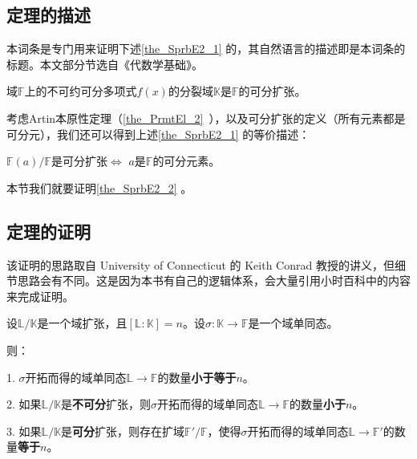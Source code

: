 

\subsection{定理的描述}

本词条是专门用来证明下述\autoref{the_SprbE2_1} 的，其自然语言的描述即是本词条的标题。本文部分节选自《代数学基础》。

\begin{theorem}{}\label{the_SprbE2_1}
域$\mathbb{F}$上的不可约可分多项式$f(x)$的分裂域$\mathbb{K}$是$\mathbb{F}$的可分扩张。
\end{theorem}

考虑Artin本原性定理（\autoref{the_PrmtEl_2}~），以及可分扩张的定义（所有元素都是可分元），我们还可以得到上述\autoref{the_SprbE2_1} 的等价描述：

\begin{theorem}{}\label{the_SprbE2_2}
$\mathbb{F}(a)/\mathbb{F}$是可分扩张$\iff$ $a$是$\mathbb{F}$的可分元素。
\end{theorem}

本节我们就要证明\autoref{the_SprbE2_2} 。



\subsection{定理的证明}
该证明的思路取自 University of Connecticut 的 Keith Conrad 教授的讲义，但细节思路会有不同。这是因为本书有自己的逻辑体系，会大量引用小时百科中的内容来完成证明。

\begin{lemma}{}\label{lem_SprbE2_1}
设$\mathbb{L}/\mathbb{K}$是一个域扩张，且$[\mathbb{L}:\mathbb{K}]=n$。设$\sigma:\mathbb{K}\to\mathbb{F}$是一个域单同态。

则：

1. $\sigma$开拓而得的域单同态$\mathbb{L}\to\mathbb{F}$的数量\textbf{小于等于}$n$。

2. 如果$\mathbb{L}/\mathbb{K}$是\textbf{不可分}扩张，则$\sigma$开拓而得的域单同态$\mathbb{L}\to\mathbb{F}$的数量\textbf{小于}$n$。

3. 如果$\mathbb{L}/\mathbb{K}$是\textbf{可分}扩张，则存在扩域$\mathbb{F}'/\mathbb{F}$，使得$\sigma$开拓而得的域单同态$\mathbb{L}\to\mathbb{F}'$的数量\textbf{等于}$n$。

\end{lemma}


